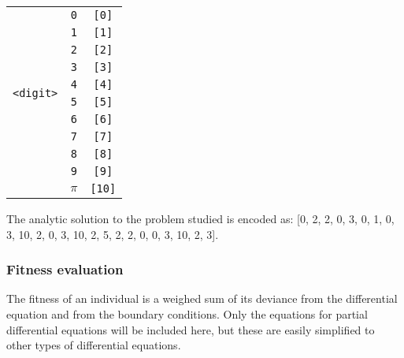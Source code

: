 \documentclass[multicolumn, 12pt]{extarticle}
\begin{document}
\begin{table}[h]
\begin{tabular}{ccc}
	\midrule
        
            \multirow{10}{*}{\texttt{<digit>}} 
            		& \multicolumn{1}{c}{\texttt{0}} & \multicolumn{1}{c}{\texttt{[0]}} \\
                                & \multicolumn{1}{c}{\texttt{1}} & \multicolumn{1}{c}{\texttt{[1]}} \\
                                & \multicolumn{1}{c}{\texttt{2}} & \multicolumn{1}{c}{\texttt{[2]}} \\
                                & \multicolumn{1}{c}{\texttt{3}} & \multicolumn{1}{c}{\texttt{[3]}} \\
                                & \multicolumn{1}{c}{\texttt{4}} & \multicolumn{1}{c}{\texttt{[4]}} \\
                                & \multicolumn{1}{c}{\texttt{5}} & \multicolumn{1}{c}{\texttt{[5]}} \\
                                & \multicolumn{1}{c}{\texttt{6}} & \multicolumn{1}{c}{\texttt{[6]}} \\
                                & \multicolumn{1}{c}{\texttt{7}} & \multicolumn{1}{c}{\texttt{[7]}} \\
                                & \multicolumn{1}{c}{\texttt{8}} & \multicolumn{1}{c}{\texttt{[8]}} \\
                                & \multicolumn{1}{c}{\texttt{9}} & \multicolumn{1}{c}{\texttt{[9]}} \\
                                & \multicolumn{1}{c}{\texttt{$\pi$}} & \multicolumn{1}{c}{\texttt{[10]}} \\
                             
        \bottomrule
        \end{tabular}
\end{table}


The analytic solution to the problem studied is encoded as: [0, 2, 2, 0, 3, 0, 1, 0, 3, 10, 2, 0, 3, 10, 2, 5, 2, 2, 0, 0, 3, 10, 2, 3]. 

\subsubsection{Fitness evaluation}
The fitness of an individual is a weighed sum of its deviance from the differential equation and from the boundary conditions. Only the equations for partial differential equations will be included here, but these are easily simplified to other types of differential equations. 
\end{document}
